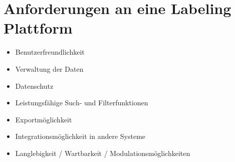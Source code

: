 \label{sec:labeling-plattform-anforderungen}
\section{Anforderungen an eine Labeling Plattform}

\begin{itemize}
  \item Benutzerfreundlichkeit
  \item Verwaltung der Daten
  \item Datenschutz
  \item Leistungsfähige Such- und Filterfunktionen
  \item Exportmöglichkeit
  \item Integrationsmöglichkeit in andere Systeme
  \item Langlebigkeit / Wartbarkeit / Modulationsmöglichkeiten
\end{itemize}